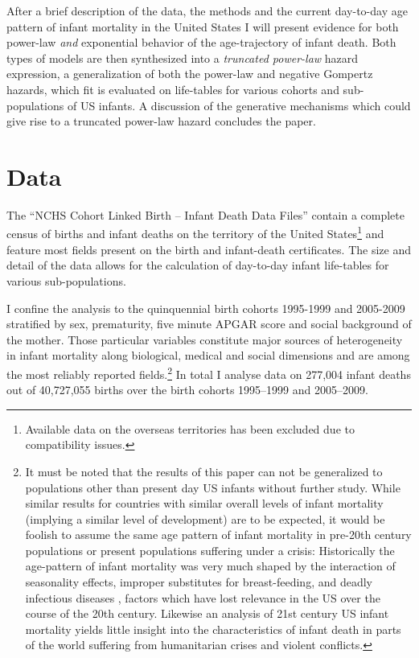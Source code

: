 \documentclass[smallextended]{svjour3} %
\begin{document}
After a brief description of the data, the methods and the current
day-to-day age pattern of infant mortality in the United States I will
present evidence for both power-law \emph{and} exponential behavior of
the age-trajectory of infant death. Both types of models are then
synthesized into a \emph{truncated power-law} hazard expression, a
generalization of both the power-law and negative Gompertz hazards,
which fit is evaluated on life-tables for various cohorts and
sub-populations of US infants. A discussion of the generative mechanisms
which could give rise to a truncated power-law hazard concludes the
paper.

\section*{Data}\label{data}

The ``NCHS Cohort Linked Birth -- Infant Death Data Files''
\citep{NCHS2016} contain a complete census of births and infant deaths
on the territory of the United States\footnote{Available data on the
  overseas territories has been excluded due to compatibility issues.}
and feature most fields present on the birth and infant-death
certificates. The size and detail of the data allows for the calculation
of day-to-day infant life-tables for various sub-populations.

I confine the analysis to the quinquennial birth cohorts 1995-1999 and
2005-2009 stratified by sex, prematurity, five minute APGAR score and
social background of the mother. Those particular variables constitute
major sources of heterogeneity in infant mortality along biological,
medical and social dimensions and are among the most reliably reported
fields.\footnote{It must be noted that the results of this paper can not
  be generalized to populations other than present day US infants
  without further study. While similar results for countries with
  similar overall levels of infant mortality (implying a similar level
  of development) are to be expected, it would be foolish to assume the
  same age pattern of infant mortality in pre-20th century populations
  or present populations suffering under a crisis: Historically the
  age-pattern of infant mortality was very much shaped by the
  interaction of seasonality effects, improper substitutes for
  breast-feeding, and deadly infectious diseases
  \citep{Knodel1977, Huck1995}, factors which have lost relevance in the
  US over the course of the 20th century. Likewise an analysis of 21st
  century US infant mortality yields little insight into the
  characteristics of infant death in parts of the world suffering from
  humanitarian crises and violent conflicts.} In total I analyse data on
277,004 infant deaths out of 40,727,055 births over the birth cohorts
1995--1999 and 2005--2009.
\end{document}
